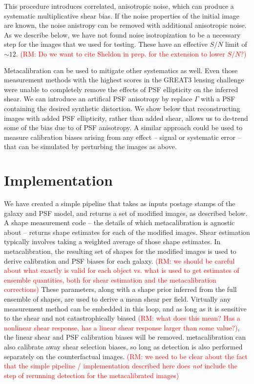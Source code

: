 \documentclass[iop]{emulateapj}
\newcommand\rmcomment[1]{\textcolor{red}{(RM: #1)}}
\begin{document}
This procedure introduces correlated, anisotropic noise, which can
produce a systematic multiplicative shear bias. If the noise
properties of the initial image are known, the noise anistropy can be
removed with additional anisotropic noise. As we describe below, we
have not found noise isotropization to be a necessary step for the
images that we used for testing.  These have an effective $S/N$ limit
of $\sim 12$.  \rmcomment{Do we want to cite Sheldon in prep. for the
  extension to lower $S/N$?}

Metacalibration can be used to mitigate other systematics as
well. Even those measurement methods with the highest scores in the
GREAT3 lensing challenge were unable to completely remove the effects
of PSF ellipticity on the inferred shear. We can introduce an
artifical PSF anisotropy by replace $\Gamma$ with a PSF containing the
desired synthetic distortion.  We show below that reconstructing
images with added PSF ellipticity, rather than added shear, allows us
to de-trend some of the bias due to of PSF anisotropy. A similar approach
could be used to measure calibration biases arising from any effect --
signal or systematic error -- that can be simulated by perturbing the
images as above.


\section{Implementation}
We have created a simple pipeline that takes as inputs postage stamps
of the galaxy and PSF model, and returns a set of modified images, as
described below. A shape measurement code -- the details of which
metacalibration is agnostic about -- returns shape estimates for each
of the modified images. Shear estimation typically involves taking a
weighted average of those shape estimates.  In metacalibration, the
resulting set of shapes for the modified images is used to derive
calibration and PSF biases for each galaxy. \rmcomment{we should be
  careful about what exactly is valid for each object vs. what is used
  to get estimates of ensemble quantities, both for shear estimation
  and the metacalibration corrections} These parameters, along with a
shape prior inferred from the full ensemble of shapes, are used to
derive a mean shear per field. Virtually any measurement method can be
embedded in this loop, and as long as it is sensitive to the shear and
not catastrophically biased \rmcomment{what does this mean?  Has a
  nonlinear shear response, has a linear shear response larger than
  some value?}, the linear shear and PSF calibration biases will be
removed. metacalibration can also calibrate away shear selection
biases, so long as detection is also performed separately on the
counterfactual images.  \rmcomment{we need to be clear about the fact
  that the simple pipeline / implementation described here does {\em
    not} include the step of rerunning detection for the
  metacalibrated images}
\end{document}
